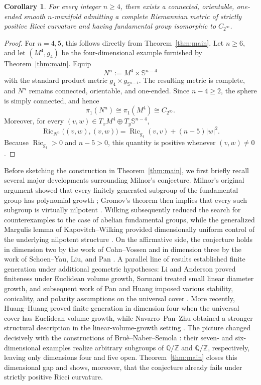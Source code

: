 \documentclass[11pt,reqno]{amsart}
\newtheorem{corollary}[theorem]{Corollary}
\theoremstyle{definition}
\numberwithin{equation}{section}
\DeclareMathOperator{\Ric}{Ric}
\newcommand{\CPrufer}{C_{2^\infty}}
\begin{document}
\begin{corollary}\label{cor:all-dimensions}
For every integer $n\ge4$, there exists a connected, orientable, one-ended
smooth $n$-manifold admitting a complete Riemannian metric of strictly
positive Ricci curvature and having fundamental group isomorphic to
$\CPrufer$.
\end{corollary}

\begin{proof}
For $n=4,5$, this follows directly from
Theorem~\ref{thm:main}.  Let $n\ge6$, and let $(M^4,g_4)$ be the
four-dimensional example furnished by Theorem~\ref{thm:main}.  Equip
\[
 N^n:=M^4\times\mathbb S^{n-4}
\]
with the standard product metric $g_4\times g_{\mathbb S^{n-4}}$. The resulting metric is complete, and $N^n$
remains connected, orientable, and one-ended.  Since $n-4\ge2$, the
sphere is simply connected, and hence
\[
 \pi_1(N^n)
 \cong\pi_1(M^4)
 \cong\CPrufer.
\]
Moreover, for every $(v,w)\in T_xM^4\oplus T_y\mathbb S^{n-4}$,
\[
 \Ric_{N^n}\bigl((v,w),(v,w)\bigr)
 =
 \Ric_{g_4}(v,v)
 +(n-5)\lvert w\rvert^2.
\]
Because $\Ric_{g_4}>0$ and $n-5>0$, this quantity is positive whenever
$(v,w)\ne0$.
\end{proof}

Before sketching the construction in Theorem~\ref{thm:main}, we first
briefly recall several major developments surrounding Milnor's
conjecture.  Milnor's original argument showed that every finitely
generated subgroup of the fundamental group has polynomial growth
\cite{Milnor1968}; Gromov's theorem then implies that every such
subgroup is virtually nilpotent \cite{Gromov1981}.  Wilking subsequently
reduced the search for counterexamples to the case of abelian
fundamental groups, while the generalized Margulis lemma of
Kapovitch--Wilking provided dimensionally uniform control of the
underlying nilpotent structure
\cite{Wilking2000,KapovitchWilking2011}.  On the affirmative side, the
conjecture holds in dimension two by the work of Cohn--Vossen and in
dimension three by the work of Schoen--Yau, Liu, and Pan
\cite{CohnVossen1935,SchoenYau1982,Liu2013,Pan2020}.  A parallel line
of results established finite generation under additional geometric
hypotheses: Li and Anderson proved finiteness under Euclidean volume
growth, Sormani treated small linear diameter growth, and subsequent
work of Pan and Huang imposed various stability, conicality, and
polarity assumptions on the universal cover
\cite{Li1986,AndersonTopology1990,SormaniDiameter,PanStability,
PanAlmostStability,HuangPolar}.  More recently, Huang--Huang proved
finite generation in dimension four when the universal cover has
Euclidean volume growth, while Navarro--Pan--Zhu obtained a stronger
structural description in the linear-volume-growth setting
\cite{HuangHuang2025,NavarroPanZhu2024}.  The picture changed
decisively with the constructions of Bru\`e--Naber--Semola
\cite{BNS7,BNS6}: their
seven- and six-dimensional examples realize arbitrary subgroups of
\(\mathbb Q/\mathbb Z\) and \(\mathbb Q/\mathbb Z\), respectively,
leaving only dimensions four and five open.
Theorem~\ref{thm:main}
closes this dimensional gap and shows, moreover, that the conjecture
already fails under strictly positive Ricci curvature.
\end{document}
